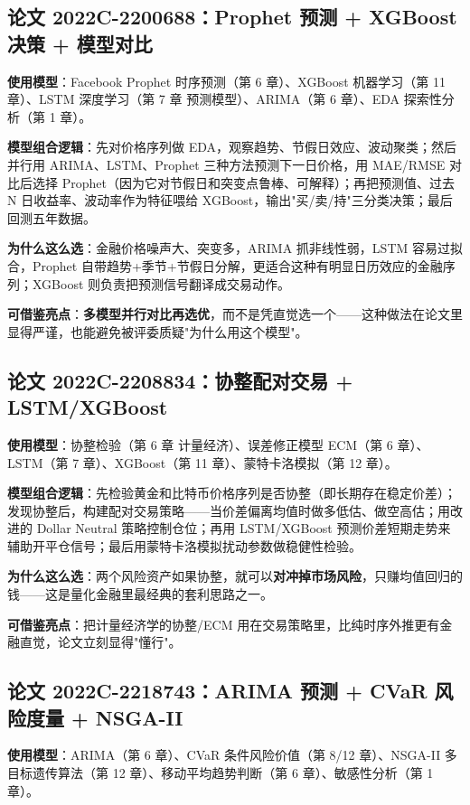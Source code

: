 \subsection{论文 2022C-2200688：Prophet 预测 + XGBoost 决策 + 模型对比}
\textbf{使用模型}：Facebook Prophet 时序预测（第 6 章）、XGBoost 机器学习（第 11 章）、LSTM 深度学习（第 7 章 预测模型）、ARIMA（第 6 章）、EDA 探索性分析（第 1 章）。

\textbf{模型组合逻辑}：先对价格序列做 EDA，观察趋势、节假日效应、波动聚类；然后并行用 ARIMA、LSTM、Prophet 三种方法预测下一日价格，用 MAE/RMSE 对比后选择 Prophet（因为它对节假日和突变点鲁棒、可解释）；再把预测值、过去 N 日收益率、波动率作为特征喂给 XGBoost，输出"买/卖/持"三分类决策；最后回测五年数据。

\textbf{为什么这么选}：金融价格噪声大、突变多，ARIMA 抓非线性弱，LSTM 容易过拟合，Prophet 自带趋势+季节+节假日分解，更适合这种有明显日历效应的金融序列；XGBoost 则负责把预测信号翻译成交易动作。

\textbf{可借鉴亮点}：\textbf{多模型并行对比再选优}，而不是凭直觉选一个——这种做法在论文里显得严谨，也能避免被评委质疑"为什么用这个模型"。

\subsection{论文 2022C-2208834：协整配对交易 + LSTM/XGBoost}
\textbf{使用模型}：协整检验（第 6 章 计量经济）、误差修正模型 ECM（第 6 章）、LSTM（第 7 章）、XGBoost（第 11 章）、蒙特卡洛模拟（第 12 章）。

\textbf{模型组合逻辑}：先检验黄金和比特币价格序列是否协整（即长期存在稳定价差）；发现协整后，构建配对交易策略——当价差偏离均值时做多低估、做空高估；用改进的 Dollar Neutral 策略控制仓位；再用 LSTM/XGBoost 预测价差短期走势来辅助开平仓信号；最后用蒙特卡洛模拟扰动参数做稳健性检验。

\textbf{为什么这么选}：两个风险资产如果协整，就可以\textbf{对冲掉市场风险}，只赚均值回归的钱——这是量化金融里最经典的套利思路之一。

\textbf{可借鉴亮点}：把计量经济学的协整/ECM 用在交易策略里，比纯时序外推更有金融直觉，论文立刻显得"懂行"。

\subsection{论文 2022C-2218743：ARIMA 预测 + CVaR 风险度量 + NSGA-II}
\textbf{使用模型}：ARIMA（第 6 章）、CVaR 条件风险价值（第 8/12 章）、NSGA-II 多目标遗传算法（第 12 章）、移动平均趋势判断（第 6 章）、敏感性分析（第 1 章）。

